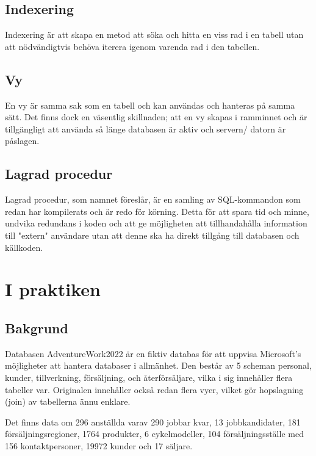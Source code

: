 \documentclass[]{article}
\begin{document}
\subsection{Indexering}

Indexering är att skapa en metod att söka och hitta en viss rad i en tabell utan att nödvändigtvis behöva iterera igenom varenda rad i den tabellen.



\subsection{Vy}

En vy är samma sak som en tabell och kan användas och hanteras på samma sätt. Det finns dock en väsentlig skillnaden; att en vy skapas i ramminnet och är tillgängligt att använda så länge databasen är aktiv och servern/ datorn är påslagen.



\subsection{Lagrad procedur}

Lagrad procedur, som namnet föreslår, är en samling av SQL-kommandon som redan har kompilerats och är redo för körning. Detta för att spara tid och minne, undvika redundans i koden och att ge möjligheten att tillhandahålla information till "extern" användare utan att denne ska ha direkt tillgång till databasen och källkoden.



\section{I praktiken}


\subsection{Bakgrund}

Databasen AdventureWork2022 är en fiktiv databas för att uppvisa Microsoft's möjligheter att hantera databaser i allmänhet. Den består av 5 scheman personal, kunder, tillverkning, försäljning, och återförsäljare, vilka i sig innehåller flera tabeller var. Originalen innehåller också redan flera vyer, vilket gör hopslagning (join) av tabellerna ännu enklare.

Det finns data om 296 anställda varav 290 jobbar kvar, 13 jobbkandidater, 181 försäljningsregioner, 1764 produkter, 6 cykelmodeller, 104 försäljningsställe med 156 kontaktpersoner, 19972 kunder och 17 säljare.
\end{document}
